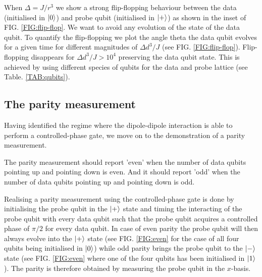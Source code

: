 When $\Delta = J/r^3$ we show a strong flip-flopping behaviour between the data (initialised in $\ket{0}$) and probe qubit (initialised in $\ket{+}$) as shown in the inset of FIG. \ref{FIG:flip-flop}. We want to avoid any evolution of the state of the data qubit. To quantify the flip-flopping we plot the angle theta the data qubit evolves for a given time for different magnitudes of $\Delta d^3/ J$ (see FIG. \ref{FIG:flip-flop}). Flip-flopping disappears for $\Delta d^3/ J > 10^4$ preserving the data qubit state. This is achieved by using different species of qubits for the data and probe lattice (see Table. \ref{TAB:qubits}).

\subsection{The parity measurement}
Having identified the regime where the dipole-dipole interaction is able to perform a controlled-phase gate, we move on to the demonstration of a parity measurement.

The parity measurement should report 'even' when the number of data qubits pointing up and pointing down is even. And it should report 'odd' when the number of data qubits pointing up and pointing down is odd.

Realising a parity measurement using the controlled-phase gate is done by initialising the probe qubit in the $\ket{+}$ state and timing the interacting of the probe qubit with every data qubit such that the probe qubit acquires a controlled phase of $\pi/2$ for every data qubit. In case of even parity the probe qubit will then always evolve into the $\ket{+}$ state (see FIG. \ref{FIG:even} for the case of all four qubits being initialised in $\ket{0}$) while odd parity brings the probe qubit to the $\ket{-}$ state (see FIG. \ref{FIG:even} where one of the four qubits has been initialised in $\ket{1}$). The parity is therefore obtained by measuring the probe qubit in the $x$-basis.    


